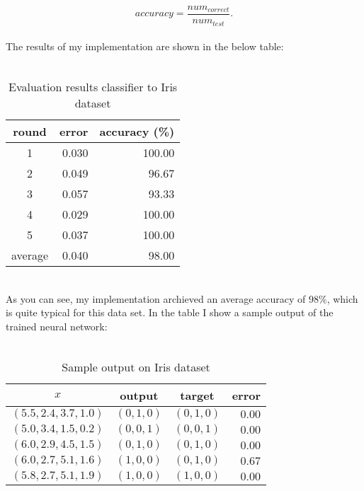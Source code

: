 \begin{equation*}
accuracy = \frac{ num_{correct} }{ num_{test} }.
\end{equation*}
\\
The results of my implementation are shown in the below table: 
\\
\\
\begin{table}[h]
  \centering
  \begin{tabular}[c]{crr}
    \hline
    round			& error						& accuracy (\%) 		\\
    \hline
    1					& 0.030					& 100.00					\\
    2					& 0.049					& 96.67					\\
    3					& 0.057					& 93.33					\\
    4					& 0.029					& 100.00					\\
    5					& 0.037					& 100.00					\\
    \hline
    average		& 0.040					& 98.00					\\
    \hline
  \end{tabular}
  \caption{Evaluation results classifier to Iris dataset}
  \label{tab:kfold}
\end{table}
\\
As you can see, my implementation archieved an average accuracy of $98\%$, which is quite typical for this data set. In the table I show a sample output of the trained neural network:
\\
\\
\begin{table}[h]
  \centering
  \begin{tabular}[c]{cccr}
    \hline
    $x$								& output			& target			& error		\\
    \hline
    $(5.5, 2.4, 3.7, 1.0)$ 	& $(0, 1, 0)$ 	& $(0, 1, 0)$  	& $0.00$	\\
    $(5.0, 3.4, 1.5, 0.2)$ 	& $(0, 0, 1)$	& $(0, 0, 1)$   & $0.00$	\\
    $(6.0, 2.9, 4.5, 1.5)$ 	& $(0, 1, 0)$	& $(0, 1, 0)$   & $0.00$	\\
    $(6.0, 2.7, 5.1, 1.6)$ 	& $(1, 0, 0)$ 	& $(0, 1, 0)$ 	& $0.67$	\\
    $(5.8, 2.7, 5.1, 1.9)$ 	& $(1, 0, 0)$ 	& $(1, 0, 0)$   & $0.00$	\\
    \hline
  \end{tabular}
  \caption{Sample output on Iris dataset}
  \label{tab:iris_example}
\end{table}

